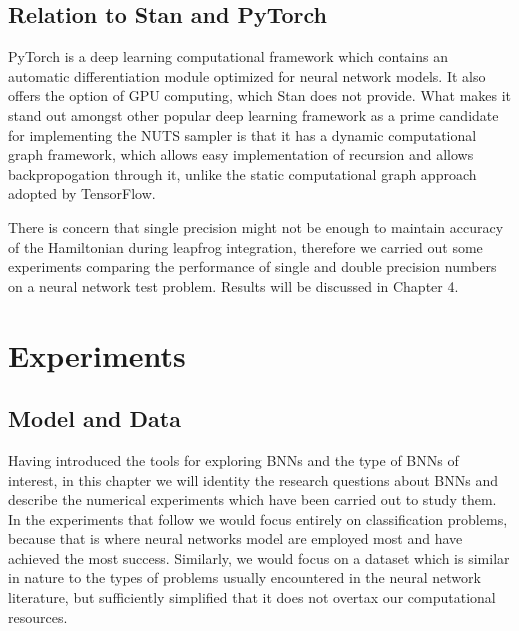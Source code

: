 \documentclass[12pt]{report}
\begin{document}
\section{Relation to Stan and PyTorch}

PyTorch \cite{paszke2017automatic} is a deep learning computational framework which contains an automatic differentiation module optimized for neural network models. It also offers the option of GPU computing, which Stan does not provide. What makes it stand out amongst other popular deep learning framework as a prime candidate for implementing the NUTS sampler is that it has a dynamic computational graph framework, which allows easy implementation of recursion and allows backpropogation through it, unlike the static computational graph approach adopted by TensorFlow.

There is concern that single precision might not be enough to maintain accuracy of the Hamiltonian during leapfrog integration, therefore we carried out some experiments comparing the performance of single and double precision numbers on a neural network test problem. Results will be discussed in Chapter 4.


\chapter{Experiments}
\section{Model and Data}
\label{sec:nnmodel}
Having introduced the tools for exploring BNNs and the type of BNNs of interest, in this chapter we will identity the research questions about BNNs and describe the numerical experiments which have been carried out to study them. In the experiments that follow we would focus entirely on classification problems, because that is where neural networks model are employed most and have achieved the most success. Similarly, we would focus on a dataset which is similar in nature to the types of problems usually encountered in the neural network literature, but sufficiently simplified that it does not overtax our computational resources. 
\end{document}
